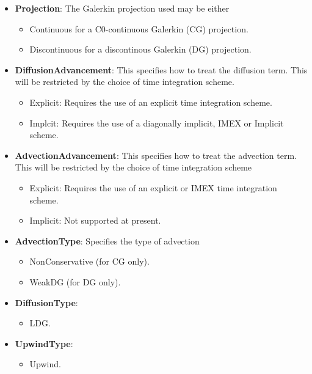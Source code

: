 \begin{itemize}
\begin{table}[h!]
\begin{center}
\begin{tabular}{|c|c|c|c|c|}
\end{tabular}
\end{center}
\label{t:ADR2}
\end{table}
\vspace{-1 cm}
\item \textbf{Projection}: The Galerkin projection used may be either
\begin{itemize}
	\item Continuous for a C0-continuous Galerkin (CG) projection.
	\item Discontinuous for a discontinous Galerkin (DG) projection.
\end{itemize}
\item \textbf{DiffusionAdvancement}: This specifies how to treat the diffusion term. This will be restricted by the choice of time integration scheme.
\begin{itemize}
	\item Explicit: Requires the use of an explicit time integration scheme.
	\item Implcit: Requires the use of a diagonally implicit, IMEX or Implicit scheme.
\end{itemize}
\item \textbf{AdvectionAdvancement}: This specifies how to treat the advection term. This will be restricted by the choice of time integration scheme
\begin{itemize}
	\item Explicit: Requires the use of an explicit or IMEX time integration scheme.
	\item Implicit: Not supported at present.
\end{itemize}
\item \textbf{AdvectionType}: Specifies the type of advection
\begin{itemize}
	\item NonConservative (for CG only).
	\item WeakDG (for DG only).
\end{itemize}
\item \textbf{DiffusionType}:
\begin{itemize}
	\item LDG.
\end{itemize}
\item \textbf{UpwindType}:
\begin{itemize}
	\item Upwind.
\end{itemize}
\end{itemize}

